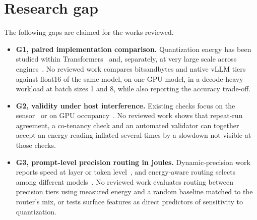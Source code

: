 \section{Research gap}
The following gaps are claimed for the works reviewed.

\begin{itemize}
\item \textbf{G1, paired implementation comparison.} Quantization energy has been studied within Transformers~\cite{b6,b47} and, separately, at very large scale across engines~\cite{b7}. No reviewed work compares bitsandbytes and native vLLM tiers against float16 of the same model, on one GPU model, in a decode-heavy workload at batch sizes 1 and 8, while also reporting the accuracy trade-off.
\item \textbf{G2, validity under host interference.} Existing checks focus on the sensor~\cite{b17} or on GPU occupancy~\cite{b47}. No reviewed work shows that repeat-run agreement, a co-tenancy check and an automated validator can together accept an energy reading inflated several times by a slowdown not visible at those checks.
\item \textbf{G3, prompt-level precision routing in joules.} Dynamic-precision work reports speed at layer or token level~\cite{b25,b50,b51,b52}, and energy-aware routing selects among different models~\cite{b48,b49}. No reviewed work evaluates routing between precision tiers using measured energy and a random baseline matched to the router's mix, or tests surface features as direct predictors of sensitivity to quantization.
\end{itemize}
